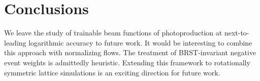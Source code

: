 \section{Conclusions}\label{sec:conclusions}

We leave the study of trainable beam functions of photoproduction at
next-to-leading logarithmic accuracy to future work. It would be
interesting to combine this approach with normalizing flows. The
treatment of BRST-invariant negative event weights is admittedly
heuristic. Extending this framework to rotationally symmetric lattice
simulations is an exciting direction for future work.

